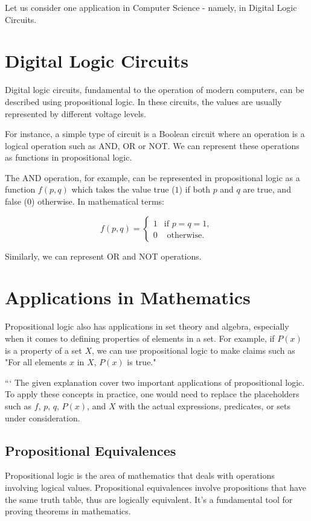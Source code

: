 Let us consider one application in Computer Science - namely, in Digital Logic Circuits.

\section*{Digital Logic Circuits}

Digital logic circuits, fundamental to the operation of modern computers, can be described using propositional logic. In these circuits, the values are usually represented by different voltage levels.

For instance, a simple type of circuit is a Boolean circuit where an operation is a logical operation such as AND, OR or NOT. We can represent these operations as functions in propositional logic.

The AND operation, for example, can be represented in propositional logic as a function \(f(p, q)\) which takes the value true (\(1\)) if both \(p\) and \(q\) are true, and false (\(0\)) otherwise. In mathematical terms:

\[
f(p, q) = 
\begin{cases} 
1 & \text{if } p = q = 1, \\
0 & \text{ otherwise.}
\end{cases}
\]

Similarly, we can represent OR and NOT operations. 

\section*{Applications in Mathematics}

Propositional logic also has applications in set theory and algebra, especially when it comes to defining properties of elements in a set. For example, if \(P(x)\) is a property of a set \(X\), we can use propositional logic to make claims such as "For all elements \(x\) in \(X\), \(P(x)\) is true."


```
The given explanation cover two important applications of propositional logic. To apply these concepts in practice, one would need to replace the placeholders such as \(f\), \(p\), \(q\), \(P(x)\), and \(X\) with the actual expressions, predicates, or sets under consideration.





\subsection{Propositional Equivalences}
Propositional logic is the area of mathematics that deals with operations involving logical values. Propositional equivalences involve propositions that have the same truth table, thus are logically equivalent. It's a fundamental tool for proving theorems in mathematics.


